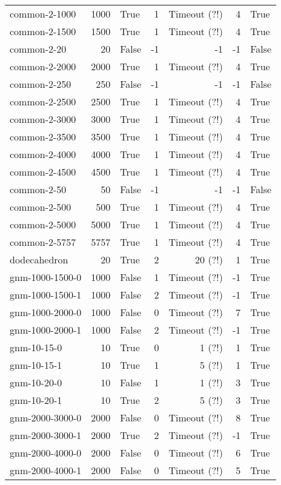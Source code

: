 \begin{longtable}{lrlrrrl}
common-2-1000 & 1000 & True & 1 & Timeout (?!) & 4 & True \\
common-2-1500 & 1500 & True & 1 & Timeout (?!) & 4 & True \\
common-2-20 & 20 & False & -1 & -1 & -1 & False \\
common-2-2000 & 2000 & True & 1 & Timeout (?!) & 4 & True \\
common-2-250 & 250 & False & -1 & -1 & -1 & False \\
common-2-2500 & 2500 & True & 1 & Timeout (?!) & 4 & True \\
common-2-3000 & 3000 & True & 1 & Timeout (?!) & 4 & True \\
common-2-3500 & 3500 & True & 1 & Timeout (?!) & 4 & True \\
common-2-4000 & 4000 & True & 1 & Timeout (?!) & 4 & True \\
common-2-4500 & 4500 & True & 1 & Timeout (?!) & 4 & True \\
common-2-50 & 50 & False & -1 & -1 & -1 & False \\
common-2-500 & 500 & True & 1 & Timeout (?!) & 4 & True \\
common-2-5000 & 5000 & True & 1 & Timeout (?!) & 4 & True \\
common-2-5757 & 5757 & True & 1 & Timeout (?!) & 4 & True \\
dodecahedron & 20 & True & 2 & 20 (?!) & 1 & True \\
gnm-1000-1500-0 & 1000 & False & 1 & Timeout (?!) & -1 & True \\
gnm-1000-1500-1 & 1000 & False & 2 & Timeout (?!) & -1 & True \\
gnm-1000-2000-0 & 1000 & False & 0 & Timeout (?!) & 7 & True \\
gnm-1000-2000-1 & 1000 & False & 2 & Timeout (?!) & -1 & True \\
gnm-10-15-0 & 10 & True & 0 & 1 (?!) & 1 & True \\
gnm-10-15-1 & 10 & True & 1 & 5 (?!) & 1 & True \\
gnm-10-20-0 & 10 & False & 1 & 1 (?!) & 3 & True \\
gnm-10-20-1 & 10 & True & 2 & 5 (?!) & 3 & True \\
gnm-2000-3000-0 & 2000 & False & 0 & Timeout (?!) & 8 & True \\
gnm-2000-3000-1 & 2000 & True & 2 & Timeout (?!) & -1 & True \\
gnm-2000-4000-0 & 2000 & False & 0 & Timeout (?!) & 6 & True \\
gnm-2000-4000-1 & 2000 & False & 0 & Timeout (?!) & 5 & True \\

\end{longtable}
